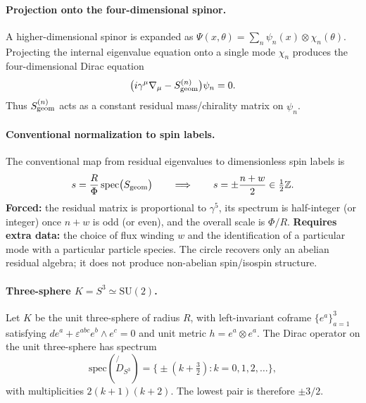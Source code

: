 \documentclass[11pt,a4paper]{article}
\begin{document}
\paragraph{Projection onto the four-dimensional spinor.}
A higher-dimensional spinor is expanded as
\(\Psi(x,\theta)=\sum_n\psi_n(x)\otimes\chi_n(\theta)\). Projecting the internal eigenvalue equation onto a single mode \(\chi_n\) produces the four-dimensional Dirac equation
\begin{equation}
\bigl(i\gamma^\mu\nabla_\mu-S_{\rm geom}^{(n)}\bigr)\psi_n=0.
\label{eq:4d-dirac-S1}
\end{equation}
Thus \(S_{\rm geom}^{(n)}\) acts as a constant residual mass/chirality matrix on \(\psi_n\).

\paragraph{Conventional normalization to spin labels.}
The conventional map from residual eigenvalues to dimensionless spin labels is
\begin{equation}
s=\frac{R}{\Phi}\,\mathrm{spec}\bigl(S_{\rm geom}\bigr)
\qquad\Longrightarrow\qquad
s=\pm\frac{n+w}{2}\in\tfrac12\mathbb{Z}.
\label{eq:spin-norm-S1}
\end{equation}
\textbf{Forced:} the residual matrix is proportional to \(\gamma^5\), its spectrum is half-integer (or integer) once \(n+w\) is odd (or even), and the overall scale is \(\Phi/R\). \textbf{Requires extra data:} the choice of flux winding \(w\) and the identification of a particular mode with a particular particle species. The circle recovers only an abelian residual algebra; it does not produce non-abelian spin/isospin structure.

\paragraph{Three-sphere \(K=S^3\simeq\mathrm{SU}(2)\).}
Let \(K\) be the unit three-sphere of radius \(R\), with left-invariant coframe \(\{e^a\}_{a=1}^3\) satisfying \(de^a+\varepsilon^{abc}e^b\wedge e^c=0\) and unit metric \(h=e^a\otimes e^a\). The Dirac operator on the unit three-sphere has spectrum \cite{Bar1992}
\begin{equation}
\mathrm{spec}(\not{D}_{S^3})=\bigl\{\pm(k+\tfrac32):k=0,1,2,\dots\bigr\},
\label{eq:dirac-S3-spec}
\end{equation}
with multiplicities \(2(k+1)(k+2)\). The lowest pair is therefore \(\pm3/2\).
\end{document}
